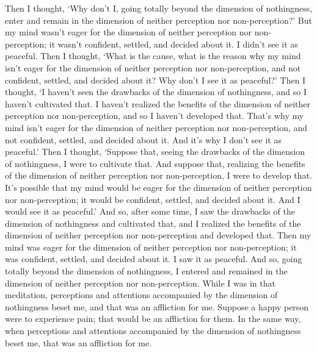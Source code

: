 \documentclass[12pt,openany]{book}%
\begin{document}
Then I thought, ‘Why don’t I, going totally beyond the dimension of nothingness, enter and remain in the dimension of neither perception nor non-perception?’ But my mind wasn’t eager for the dimension of neither perception nor non-perception; it wasn’t confident, settled, and decided about it. I didn’t see it as peaceful. Then I thought, ‘What is the cause, what is the reason why my mind isn’t eager for the dimension of neither perception nor non-perception, and not confident, settled, and decided about it? Why don’t I see it as peaceful?’ Then I thought, ‘I haven’t seen the drawbacks of the dimension of nothingness, and so I haven’t cultivated that. I haven’t realized the benefits of the dimension of neither perception nor non-perception, and so I haven’t developed that. That’s why my mind isn’t eager for the dimension of neither perception nor non-perception, and not confident, settled, and decided about it. And it’s why I don’t see it as peaceful.’ Then I thought, ‘Suppose that, seeing the drawbacks of the dimension of nothingness, I were to cultivate that. And suppose that, realizing the benefits of the dimension of neither perception nor non-perception, I were to develop that. It’s possible that my mind would be eager for the dimension of neither perception nor non-perception; it would be confident, settled, and decided about it. And I would see it as peaceful.’ And so, after some time, I saw the drawbacks of the dimension of nothingness and cultivated that, and I realized the benefits of the dimension of neither perception nor non-perception and developed that. Then my mind was eager for the dimension of neither perception nor non-perception; it was confident, settled, and decided about it. I saw it as peaceful. And so, going totally beyond the dimension of nothingness, I entered and remained in the dimension of neither perception nor non-perception. While I was in that meditation, perceptions and attentions accompanied by the dimension of nothingness beset me, and that was an affliction for me. Suppose a happy person were to experience pain; that would be an affliction for them. In the same way, when perceptions and attentions accompanied by the dimension of nothingness beset me, that was an affliction for me. 
\end{document}
